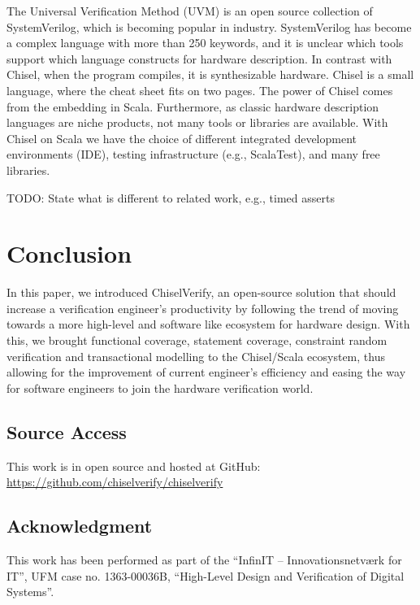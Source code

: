 \documentclass[runningheads]{llncs}
\newcommand{\todo}[1]{{\color{olive} TODO: #1}}
\begin{document}
The Universal Verification Method (UVM) is an open source collection of SystemVerilog,
which is becoming popular in industry.
SystemVerilog has become a complex language with more than 250 keywords, and it is unclear
which tools support which language constructs for hardware description.
In contrast with Chisel, when the program compiles, it is synthesizable hardware.
Chisel is a small language, where the cheat sheet fits on two pages.
The power of Chisel comes from the embedding in Scala.
Furthermore, as classic hardware description languages are niche products, not
many tools or libraries are available. 
With Chisel on Scala we have the choice of different integrated development environments (IDE),
testing infrastructure (e.g., ScalaTest), and many free libraries.

\todo{State what is different to related work, e.g., timed asserts}

\section{Conclusion}
In this paper, we introduced ChiselVerify, an open-source solution that should increase a verification engineer's productivity by following the trend of moving towards a more high-level and software like ecosystem for hardware design. With this, we brought functional coverage, statement coverage, constraint random verification and transactional modelling to the Chisel/Scala ecosystem, thus allowing for the improvement of current engineer's efficiency and easing the way for software engineers to join the hardware verification world.

\subsection*{Source Access}

This work is in open source and hosted at GitHub: \url{https://github.com/chiselverify/chiselverify}

\subsection*{Acknowledgment}

This work has been performed as part of the
``InfinIT -- Innovationsnetv{\ae}rk for IT'', UFM case no. 1363-00036B,
``High-Level Design and Verification of Digital Systems''.



\end{document}
